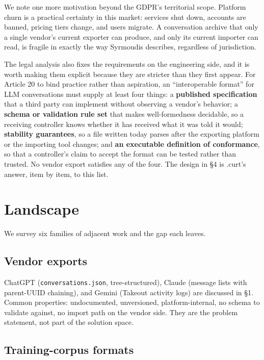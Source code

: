 \documentclass[11pt]{article}
\begin{document}
We note one more motivation beyond the GDPR's territorial scope. Platform churn is a practical certainty in this market: services shut down, accounts are banned, pricing tiers change, and users migrate. A conversation archive that only a single vendor's current exporter can produce, and only its current importer can read, is fragile in exactly the way Syrmoudis describes, regardless of jurisdiction.

The legal analysis also fixes the requirements on the engineering side, and it is worth making them explicit because they are stricter than they first appear. For Article 20 to bind practice rather than aspiration, an ``interoperable format'' for LLM conversations must supply at least four things: a \textbf{published specification} that a third party can implement without observing a vendor's behavior; a \textbf{schema or validation rule set} that makes well-formedness decidable, so a receiving controller knows whether it has received what it was told it would; \textbf{stability guarantees}, so a file written today parses after the exporting platform or the importing tool changes; and \textbf{an executable definition of conformance}, so that a controller's claim to accept the format can be tested rather than trusted. No vendor export satisfies any of the four. The design in \S4 is .curt's answer, item by item, to this list.

\section{Landscape}

We survey six families of adjacent work and the gap each leaves.

\subsection{Vendor exports}

ChatGPT (\texttt{conversations.json}, tree-structured), Claude (message lists with parent-UUID chaining), and Gemini (Takeout activity logs) are discussed in \S1. Common properties: undocumented, unversioned, platform-internal, no schema to validate against, no import path on the vendor side. They are the problem statement, not part of the solution space.

\subsection{Training-corpus formats}
\end{document}
